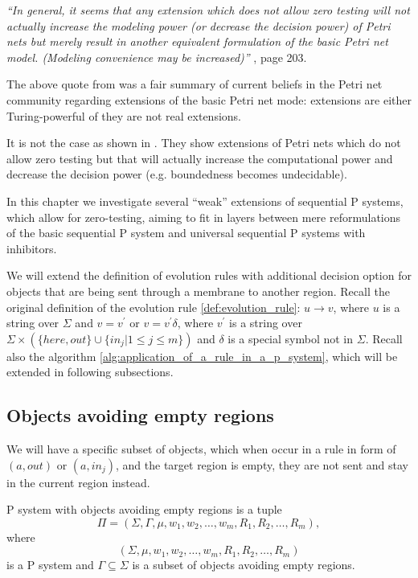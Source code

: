 {\em ``In general, it seems that any extension which does not allow zero testing will not actually increase the modeling power (or decrease the decision power) of Petri nets but merely result in another equivalent formulation of the basic Petri net model. (Modeling convenience may be increased)''} \cite{Peterson81PetriNets}, page 203.

The above quote from \cite{Peterson81PetriNets} was a fair summary of current beliefs in the Petri net community regarding extensions of the basic Petri net mode: extensions are either Turing-powerful of they are not real extensions.

It is not the case as shown in \cite{Dufourd98Reset}. They show extensions of Petri nets which do not allow zero testing but that will actually increase the computational power and decrease the decision power (e.g. boundedness becomes undecidable).

In this chapter we investigate several ``weak'' extensions of sequential P systems, which allow for zero-testing, aiming to fit in layers between mere reformulations of the basic sequential P system and universal sequential P systems with inhibitors.

We will extend the definition of evolution rules with additional decision option for objects that are being sent through a membrane to another region. Recall the original definition of the evolution rule \ref{def:evolution_rule}: $u\rightarrow v$, where $u$ is a string over $\Sigma$ and $v=v^\prime$ or $v=v^\prime\delta$, where $v^\prime$ is a string over $\Sigma\times(\{here, out\}\cup\{in_j|1\leq j\leq m\})$ and $\delta$ is a special symbol not in $\Sigma$. Recall also the algorithm \ref{alg:application_of_a_rule_in_a_p_system}, which will be extended in following subsections.

\subsection{Objects avoiding empty regions} %
\label{sub:objects_avoiding_empty_regions}

We will have a specific subset of objects, which when occur in a rule in form of $(a, out)$ or $(a, in_j)$, and the target region is empty, they are not sent and stay in the current region instead.

\begin{definition}
  P system with objects avoiding empty regions is a tuple $$\Pi = (\Sigma, \Gamma, \mu, w_1, w_2,\ldots , w_m, R_1, R_2,\ldots , R_m),$$ where $$(\Sigma, \mu, w_1, w_2,\ldots , w_m, R_1, R_2,\ldots , R_m)$$ is a P system and $\Gamma\subseteq\Sigma$ is a subset of objects avoiding empty regions.
\end{definition}

